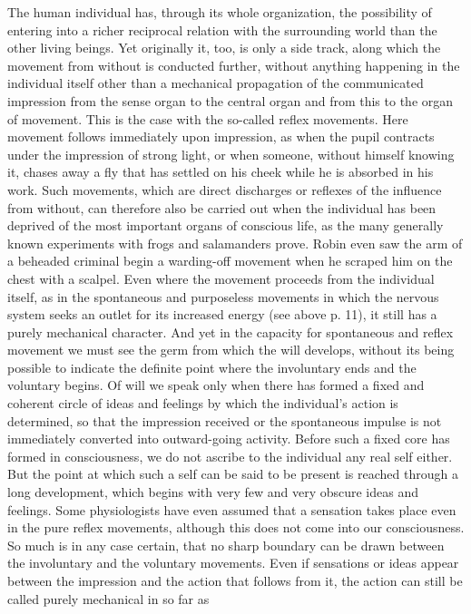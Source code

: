 \documentclass[12pt,a4paper,openany]{book}
\newcommand{\opage}[1]{\marginnote{\footnotesize\textit{[#1]}}}
\begin{document}
The human individual has, through its whole organization, the possibility of
entering into a richer reciprocal relation with the surrounding world than the
other living beings. Yet originally it, too, is only a side track,
\opage{113}along which the movement from without is conducted further, without
anything happening in the individual itself other than a mechanical
propagation of the communicated impression from the sense organ to the central
organ and from this to the organ of movement. This is the case with the
so-called reflex movements. Here movement follows immediately upon impression,
as when the pupil contracts under the impression of strong light, or when
someone, without himself knowing it, chases away a fly that has settled on his
cheek while he is absorbed in his work. Such movements, which are direct
discharges or reflexes of the influence from without, can therefore also be
carried out when the individual has been deprived of the most important organs
of conscious life, as the many generally known experiments with frogs and
salamanders prove. Robin even saw the arm of a beheaded criminal begin a
warding-off movement when he scraped him on the chest with a scalpel. Even
where the movement proceeds from the individual itself, as in the spontaneous
and purposeless movements in which the nervous system seeks an outlet for its
increased energy (see above p. 11), it still has a purely mechanical
character. And yet in the capacity for spontaneous and reflex movement we must
see the germ from which the will develops, without its being possible to
indicate the definite point where the involuntary ends and the voluntary
begins. Of will we speak only when there has formed a fixed and coherent
circle of ideas and feelings by which the individual's action is determined,
so that the impression received or the spontaneous impulse is not immediately
converted into outward-going \opage{114}activity. Before such a fixed core has
formed in consciousness, we do not ascribe to the individual any real self
either. But the point at which such a self can be said to be present is
reached through a long development, which begins with very few and very
obscure ideas and feelings. Some physiologists have even assumed that a
sensation takes place even in the pure reflex movements, although this does
not come into our consciousness. So much is in any case certain, that no sharp
boundary can be drawn between the involuntary and the voluntary movements.
Even if sensations or ideas appear between the impression and the action that
follows from it, the action can still be called purely mechanical in so far as
\end{document}
